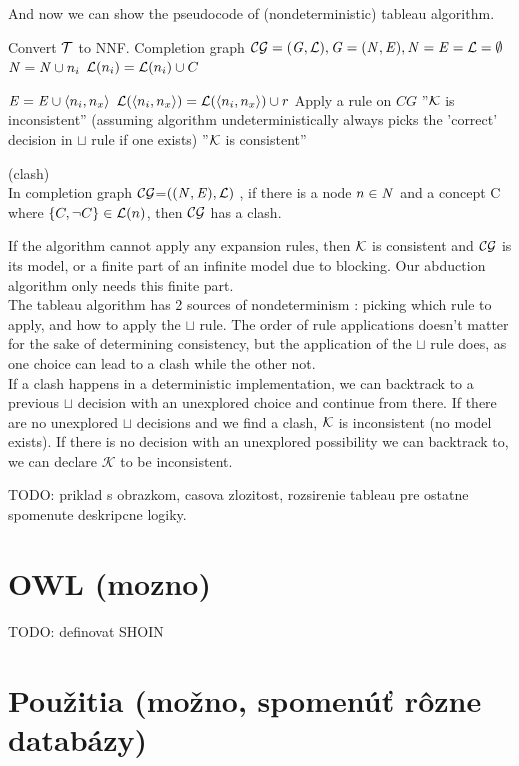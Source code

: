 And now we can show the pseudocode of (nondeterministic) tableau algorithm.

\begin{algorithm}[t!]
    \begin{algorithmic}[1]
			\State Convert $\mathcal{T}$ to NNF.
			\State Completion graph $\mathcal{CG} =(\mathit{G},\mathcal{L}) , \mathit{G}=(\mathit{N},\mathit{E}), \mathit{N} = \mathit{E} = \mathcal{L} =\emptyset$
				\State $\mathit{N} = \mathit{N} \cup n_i$
					\State $\mathcal{L} (n_i) = \mathcal{L} (n_i) \cup C$
				\EndFor
				
					\State $\mathit{E} = \mathit{E} \cup \langle n_i,n_x \rangle$
					\State $\mathcal{L} (\langle n_i,n_x \rangle) = \mathcal{L} (\langle n_i,n_x \rangle)  \cup r$
				\EndFor  
			\EndFor
				\State Apply a rule on $CG$
					\State \Return ''$\mathcal{K}$ is inconsistent''  (assuming algorithm undeterministically always picks the 'correct' decision in $\sqcup$ rule if one exists)
				\EndIf
			\EndWhile
			\State \Return ''$\mathcal{K}$ is consistent''
			\EndFunction

    \end{algorithmic}
\end{algorithm}

	\begin{mydef} (clash)\\
		In completion graph $\mathcal{CG}$=$( (\mathit{N}, \mathit{E}),\mathcal{L})$ , if there is a node $n \in \mathit{N}$ and a concept C where $\{ C , \neg C \} \in \mathcal{L} (n)$, then $\mathcal{CG}$ has a clash.
	
\end{mydef}
If the algorithm cannot apply any expansion rules, then $\mathcal{K}$ is consistent and $\mathcal{CG}$ is its model, or a finite part of an infinite model due to blocking. Our abduction algorithm only needs this finite part.\\
 The tableau algorithm has 2 sources of nondeterminism : picking which rule to apply, and how to apply the $\sqcup$ rule. The order of rule applications doesn't matter for the sake of determining consistency, but the application of the $\sqcup$ rule does, as one choice can lead to a clash while the other not. \\ 
If a clash happens in a deterministic implementation, we can backtrack to a previous $\sqcup$ decision with an unexplored choice and continue from there. If there are no unexplored $\sqcup$ decisions and we find a clash, $\mathcal{K}$ is inconsistent (no model exists).     
If there is no decision with an unexplored possibility we can backtrack to, we can declare $\mathcal{K}$ to be inconsistent.




 TODO: priklad s obrazkom, casova zlozitost, rozsirenie tableau pre ostatne spomenute deskripcne logiky.
\section{OWL (mozno)}
	TODO: definovat SHOIN
\section{Použitia  (možno, spomenúť rôzne databázy)}

